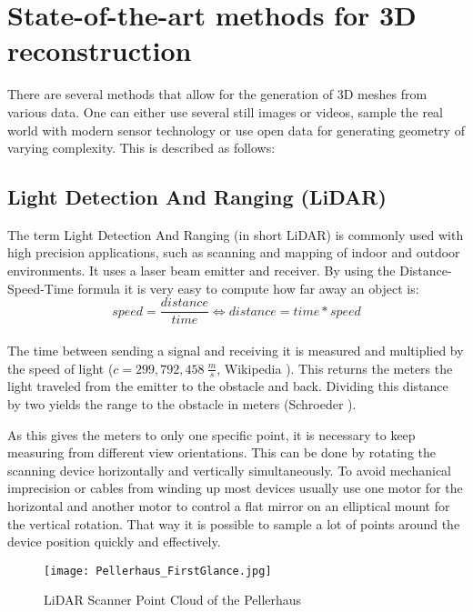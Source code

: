 \section{State-of-the-art methods for 3D reconstruction}

There are several methods that allow for the generation of 3D meshes from various data. One can either use several still images or videos, sample the real world with modern sensor technology or use open data for generating geometry of varying complexity. This is described as follows:

\subsection{Light Detection And Ranging (LiDAR)}

The term Light Detection And Ranging (in short LiDAR) is commonly used with high precision applications, such as scanning and mapping of indoor and outdoor environments. It uses a laser beam emitter and receiver. By using the Distance-Speed-Time formula it is very easy to compute how far away an object is:\\

$$  speed = \dfrac{distance}{time} \Longleftrightarrow distance = time * speed $$\\
The time between sending a signal and receiving it is measured and multiplied by the speed of light ($c = 299,792,458 \medspace \frac{m}{s}$, Wikipedia \parencite{wiki:SpeedOfLight}). This returns the meters the light traveled from the emitter to the obstacle and back. Dividing this distance by two yields the range to the obstacle in meters (Schroeder \parencite[see][p8-9]{dp_lidar}).

As this gives the meters to only one specific point, it is necessary to keep measuring from different view orientations. This can be done by rotating the scanning device horizontally and vertically simultaneously. To avoid mechanical imprecision or cables from winding up most devices usually use one motor for the horizontal and another motor to control a flat mirror on an elliptical mount for the vertical rotation. That way it is possible to sample a lot of points around the device position quickly and effectively.

\begin{figure}[h]
	\centering
	\texttt{[image: Pellerhaus\_FirstGlance.jpg]}
	\caption{LiDAR Scanner Point Cloud of the Pellerhaus}
	\label{fig:LiDAR_PointCloud}
\end{figure}

